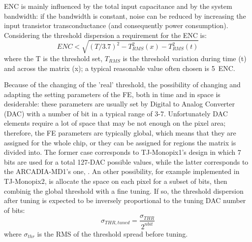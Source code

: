         ENC is mainly influenced by the total input capacitance and by the system bandwidth: if the bandwidth is constant, noise can be reduced by increasing the input transistor transconductance (and consequently power consumption). 
        Considering the threshold dispersion a requirement for the ENC is: 
        \begin{equation}
            ENC < \sqrt{(T/3.7)^2 - T_{RMS} ^2 (x) - T_{RMS} ^2 (t)}
        \end{equation}
        where the T is the threshold set, $T_{RMS}$ is the threshold variation during time (t) and across the matrix (x); a typical reasonable value often chosen is \SI{5}{ENC}.

        Because of the changing of the 'real' threshold, the possibility of changing and adapting the setting parameters of the FE, both in time and in space is desiderable: these parameters are usually set by Digital to Analog Converter (DAC) with a number of bit in a typical range of 3-7.
        Unfortunately DAC elements require a lot of space that may be not enough on the pixel area; therefore, the FE parameters are typically global, which means that they are assigned for the whole chip, or they can be assigned for regions the matrix is divided into. 
        The former case corresponds to TJ-Monopix1's design in which 7 bits are used for a total 127-DAC possible values, while the latter corresponds to the ARCADIA-MD1's one, . 
        An other possibility, for example implemented in TJ-Monopix2, is allocate the space on each pixel for a subset of bits, then combinig the global threshold with a fine tuning. 
        If so, the threshold dispersion after tuning is expected to be inversely proportional to the tuning DAC number of bits:
        \begin{equation}
            \sigma_{THR, tuned} = \frac{\sigma_{THR}}{2^{n bit}}
        \end{equation}    
        where $\sigma_{thr}$ is the RMS of the threshold spread before tuning.

